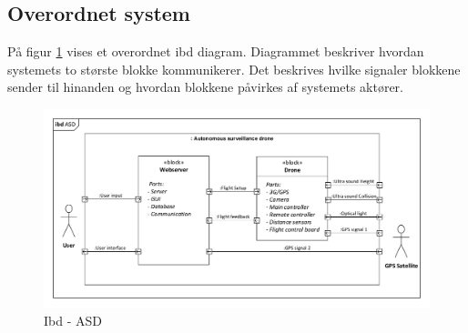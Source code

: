 \subsection{Overordnet system}

På figur \ref{fig:ibd_overordnet} vises et overordnet ibd diagram. Diagrammet beskriver hvordan systemets to største blokke kommunikerer. Det beskrives hvilke signaler blokkene sender til hinanden og hvordan blokkene påvirkes af systemets aktører. 

\begin{figure}[H]
\centering
\includegraphics[width=1\textwidth]{Billeder/IBD/ibd1_overordnet.pdf}
\vspace{-1cm}
\caption{Ibd - ASD}
\label{fig:ibd_overordnet}
\end{figure}

